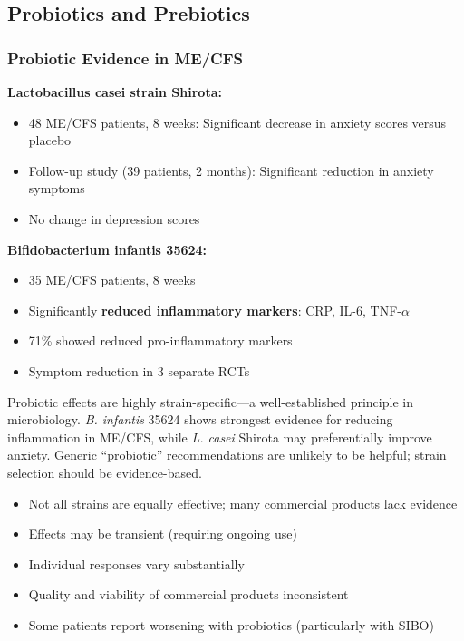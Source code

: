 \subsection{Probiotics and Prebiotics}

\subsubsection{Probiotic Evidence in ME/CFS}

\textbf{Lactobacillus casei strain Shirota:}
\begin{itemize}
    \item 48 ME/CFS patients, 8 weeks: Significant decrease in anxiety scores versus placebo
    \item Follow-up study (39 patients, 2 months): Significant reduction in anxiety symptoms
    \item No change in depression scores
\end{itemize}

\textbf{Bifidobacterium infantis 35624:}
\begin{itemize}
    \item 35 ME/CFS patients, 8 weeks
    \item Significantly \textbf{reduced inflammatory markers}: CRP, IL-6, TNF-$\alpha$
    \item 71\% showed reduced pro-inflammatory markers
    \item Symptom reduction in 3 separate RCTs
\end{itemize}

\begin{keypoint}
\label{key:probiotic-strain}
Probiotic effects are highly strain-specific---a well-established principle in microbiology. \textit{B. infantis} 35624 shows strongest evidence for reducing inflammation in ME/CFS, while \textit{L. casei} Shirota may preferentially improve anxiety. Generic ``probiotic'' recommendations are unlikely to be helpful; strain selection should be evidence-based.
\end{keypoint}

\begin{warning}
\begin{itemize}
    \item Not all strains are equally effective; many commercial products lack evidence
    \item Effects may be transient (requiring ongoing use)
    \item Individual responses vary substantially
    \item Quality and viability of commercial products inconsistent
    \item Some patients report worsening with probiotics (particularly with SIBO)
\end{itemize}
\end{warning}

